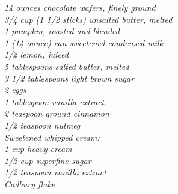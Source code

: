 \documentclass{tufte-book}
\begin{document}
\emph{14 ounces chocolate wafers, finely ground
\\3/4 cup (1 1/2 sticks) unsalted butter, melted
\\1 pumpkin, roasted and blended.
\\1 (14 ounce) can sweetened condensed milk
\\1/2 lemon, juiced
\\5 tablespoons salted butter, melted
\\3 1/2 tablespoons light brown sugar
\\2 eggs
\\1 tablespoon vanilla extract
\\2 teaspoon ground cinnamon
\\1/2 teaspoon nutmeg
\\Sweetened whipped cream:
\\1 cup heavy cream
\\1/2 cup superfine sugar
\\1/2 teaspoon vanilla extract
\\Cadbury flake
}
\end{document}
